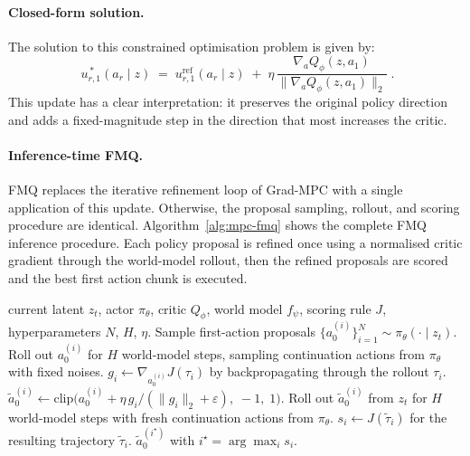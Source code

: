 \paragraph{Closed-form solution.}
The solution to this constrained optimisation problem is given by:
\begin{equation}
    \boxed{\;u^{\,*}_{r,1}(a_r \mid z) \;=\; u^{\mathrm{ref}}_{r,1}(a_r \mid z) \;+\; \eta\,\frac{\nabla_a Q_\phi(z, a_1)}{\big\|\nabla_a Q_\phi(z, a_1)\big\|_2}\;.}
    \label{eq:mpc-fmq-target}
\end{equation}
This update has a clear interpretation: it preserves the original
policy direction and adds a fixed-magnitude step in the direction
that most increases the critic.

\paragraph{Inference-time FMQ.}
FMQ replaces the iterative refinement loop of Grad-MPC with a single
application of this update. Otherwise, the proposal sampling,
rollout, and scoring procedure are identical.
Algorithm~\ref{alg:mpc-fmq} shows the complete FMQ inference procedure.
Each policy proposal is refined once using a normalised critic gradient
through the world-model rollout, then the refined proposals are scored
and the best first action chunk is executed.

\begin{algorithm}[h]
\caption{Inference-time FMQ planning.}
\label{alg:mpc-fmq}
\begin{algorithmic}[1]
\Require current latent $z_t$, actor $\pi_\theta$, critic $Q_\phi$, world model $f_\psi$, scoring rule $J$, hyperparameters $N$, $H$, $\eta$.
\State Sample first-action proposals $\{a_0^{(i)}\}_{i=1}^N \sim \pi_\theta(\cdot \mid z_t)$.
    \State Roll out $a_0^{(i)}$ for $H$ world-model steps, sampling continuation actions from $\pi_\theta$ with fixed noises.
    \State $g_i \leftarrow \nabla_{a_0^{(i)}} J(\tau_i)$ by backpropagating through the rollout $\tau_i$.
    \State $\tilde a_0^{(i)} \leftarrow \mathrm{clip}\big(a_0^{(i)} + \eta\, g_i / (\|g_i\|_2+\varepsilon),\;-1,\;1\big)$.
\EndFor
{}
    \State Roll out $\tilde a_0^{(i)}$ from $z_t$ for $H$ world-model steps with fresh continuation actions from $\pi_\theta$.
    \State $s_i \leftarrow J(\tilde\tau_i)$ for the resulting trajectory $\tilde\tau_i$.
\EndFor
\State \Return $\tilde a_0^{(i^\star)}$ with $i^\star = \arg\max_i s_i$.
\end{algorithmic}
\end{algorithm}


